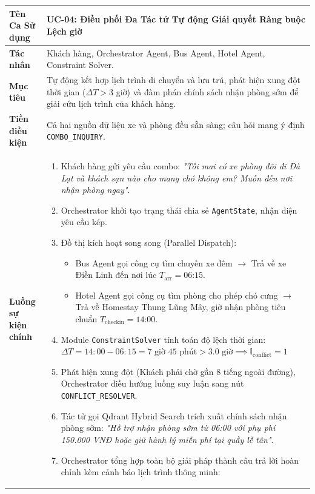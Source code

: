 \begin{table}[h!]
\centering
\small
\begin{tabular}{|p{3.2cm}|p{11.5cm}|}
\hline
\textbf{Tên Ca Sử dụng} & \textbf{UC-04: Điều phối Đa Tác tử Tự động Giải quyết Ràng buộc Lệch giờ} \\
\hline
\textbf{Tác nhân} & Khách hàng, Orchestrator Agent, Bus Agent, Hotel Agent, Constraint Solver. \\
\hline
\textbf{Mục tiêu} & Tự động kết hợp lịch trình di chuyển và lưu trú, phát hiện xung đột thời gian ($\Delta T > 3$ giờ) và đàm phán chính sách nhận phòng sớm để giải cứu lịch trình của khách hàng. \\
\hline
\textbf{Tiền điều kiện} & Cả hai nguồn dữ liệu xe và phòng đều sẵn sàng; câu hỏi mang ý định \texttt{COMBO\_INQUIRY}. \\
\hline
\textbf{Luồng sự kiện chính} & 
\begin{enumerate}
    \item Khách hàng gửi yêu cầu combo: \textit{"Tối mai có xe phòng đôi đi Đà Lạt và khách sạn nào cho mang chó không em? Muốn đến nơi nhận phòng ngay"}.
    \item Orchestrator khởi tạo trạng thái chia sẻ \texttt{AgentState}, nhận diện yêu cầu kép.
    \item Đồ thị kích hoạt song song (Parallel Dispatch):
    \begin{itemize}
        \item Bus Agent gọi công cụ tìm chuyến xe đêm $\rightarrow$ Trả về xe Điền Linh đến nơi lúc $T_{\text{arr}} = \text{06:15}$.
        \item Hotel Agent gọi công cụ tìm phòng cho phép chó cưng $\rightarrow$ Trả về Homestay Thung Lũng Mây, giờ nhận phòng tiêu chuẩn $T_{\text{checkin}} = \text{14:00}$.
    \end{itemize}
    \item Module \texttt{ConstraintSolver} tính toán độ lệch thời gian:
    $\Delta T = 14:00 - 06:15 = 7\text{ giờ } 45\text{ phút} > 3.0\text{ giờ} \implies \mathbb{I}_{\text{conflict}} = 1$
    \item Phát hiện xung đột (Khách phải chờ gần 8 tiếng ngoài đường), Orchestrator điều hướng luồng suy luận sang nút \texttt{CONFLICT\_RESOLVER}.
    \item Tác tử gọi Qdrant Hybrid Search trích xuất chính sách nhận phòng sớm: \textit{"Hỗ trợ nhận phòng sớm từ 06:00 với phụ phí 150.000 VNĐ hoặc giữ hành lý miễn phí tại quầy lễ tân"}.
    \item Orchestrator tổng hợp toàn bộ giải pháp thành câu trả lời hoàn chỉnh kèm cảnh báo lịch trình thông minh:

\end{enumerate}
\end{tabular}
\end{table}
